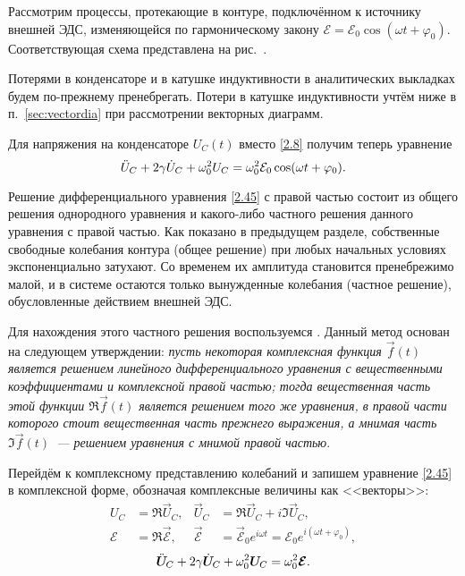 Рассмотрим процессы, протекающие в контуре, подключённом к источнику внешней
ЭДС, изменяющейся по гармоническому закону
$\mathcal{E}=\mathcal{E}_0\cos(\omega t+\varphi_0)$. Соответствующая схема
представлена на рис.~.

Потерями в конденсаторе и в катушке индуктивности в аналитических выкладках
будем по-прежнему пренебрегать.
Потери в катушке индуктивности учтём ниже в п.~\ref{sec:vectordia} 
при рассмотрении векторных диаграмм.

Для напряжения на конденсаторе $U_C(t)$ вместо \eqref{2.8} получим теперь
уравнение
\begin{equation}\eqmark{2.45}
\ddot{U}_C+2\gamma \dot{U}_C+\omega_0^2U_C=\omega_0^2\mathcal{E}_0\cos(\omega t+
\varphi_0).
\end{equation}


Решение  дифференциального уравнения \eqref{2.45} с правой
частью состоит из общего решения однородного уравнения и какого-либо частного
решения данного уравнения с правой частью. Как показано в предыдущем разделе,
собственные свободные колебания контура (общее решение) при любых начальных
условиях экспоненциально затухают. Со временем их амплитуда становится
пренебрежимо малой, и в системе остаются только вынужденные колебания (частное
решение), обусловленные действием внешней ЭДС. 

Для нахождения этого частного
решения воспользуемся . Данный метод
основан на следующем утверждении: \emph{пусть некоторая комплексная функция
$\vec{f}(t)$ является решением линейного дифференциального уравнения 
с вещественными коэффициентами и комплексной правой частью; 
тогда вещественная часть этой 
функции $\Re \vec{f}(t)$ является решением того же уравнения, 
в правой части которого стоит вещественная часть прежнего выражения, 
а мнимая часть $\Im \vec{f}(t)$~--- решением уравнения с мнимой правой частью}.

Перейдём к комплексному представлению 
колебаний и запишем уравнение \eqref{2.45} в комплексной форме, 
обозначая комплексные величины как <<векторы>>:
\begin{equation}
\begin{aligned}
U_C &= \Re \vec{U}_{\! C}, & \vec{U}_{\! C} &= \Re \vec{U}_{\! C}+i\Im \vec{U}_{\! C}, \\
\mathcal{E}&=\Re \vec{\mathcal{E}}, & \vec{\mathcal{E}}&=
\vec{\mathcal{E}}_0e^{i\omega t}=\mathcal{E}_0 e^{i(\omega t+\varphi_0)},
\end{aligned}
\end{equation}
\begin{equation}\eqmark{2.46}
\ddot{\vec U}_{\! C}+2\gamma\dot{\vec U}_{\! C}+
\omega_0^2 \vec{U}_{\! C}=\omega_0^2\vec{\mathcal{E}}.
\end{equation}

